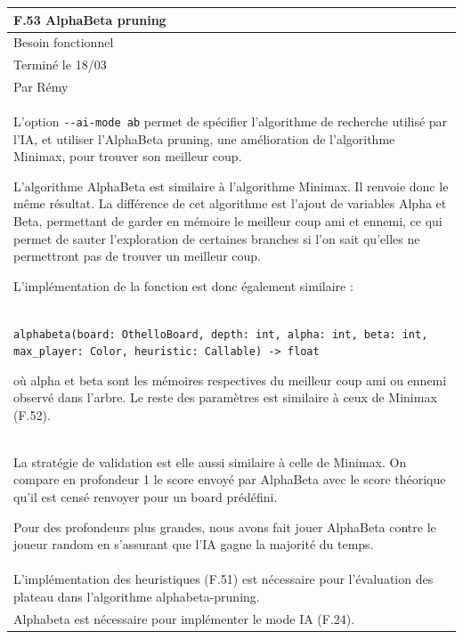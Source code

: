 \documentclass[a4paper,12pt]{article}
\begin{document}
\vspace{1cm}

\noindent
\setlength{\arrayrulewidth}{1.5pt}
\renewcommand{\arraystretch}{1.5}
\begin{tabularx}{\textwidth}{|X|}
    \hline
    \textbf{F.53 AlphaBeta pruning}                                  \\
    \hline
    Besoin fonctionnel                                               \\
    \hline
    Terminé le 18/03                                                 \\
    Par Rémy                                                         \\
    \hline
    L’option \texttt{-}\texttt{-ai-mode ab} permet de spécifier l’algorithme de recherche utilisé par l’IA, et utiliser l’AlphaBeta pruning, une amélioration de l’algorithme Minimax, pour trouver son meilleur coup.

    L’algorithme AlphaBeta est similaire à l’algorithme Minimax. Il renvoie donc le
    même résultat. La différence de cet algorithme est l’ajout de variables Alpha
    et Beta, permettant de garder en mémoire le meilleur coup ami et ennemi, ce qui
    permet de sauter l’exploration de certaines branches si l’on sait qu’elles ne
    permettront pas de trouver un meilleur coup.

    L’implémentation de la fonction est donc également similaire :   \\

    \texttt{alphabeta(board: OthelloBoard, depth: int, alpha: int, beta: int, max\_player: Color, heuristic: Callable) -> float}

    où alpha et beta sont les mémoires respectives du meilleur coup ami ou ennemi
    observé dans l’arbre. Le reste des paramètres est similaire à ceux de Minimax
    (F.52).                                                          \\ \arrayrulecolor{MediumAquamarine}\hline
    \arrayrulecolor{CornflowerBlue} La stratégie de validation est elle aussi
    similaire à celle de Minimax. On compare en profondeur 1 le score envoyé par
    AlphaBeta avec le score théorique qu’il est censé renvoyer pour un board
    prédéfini.

    Pour des profondeurs plus grandes, nous avons fait jouer AlphaBeta contre le
    joueur random en s’assurant que l’IA gagne la majorité du temps. \\
    \arrayrulecolor{MediumAquamarine}\hline \arrayrulecolor{CornflowerBlue}
    L'implémentation des heuristiques (F.51) est nécessaire pour l'évaluation des
    plateau dans l'algorithme alphabeta-pruning.                     \\ Alphabeta est nécessaire pour
    implémenter le mode IA (F.24).                                   \\ \hline
\end{tabularx}
\end{document}
